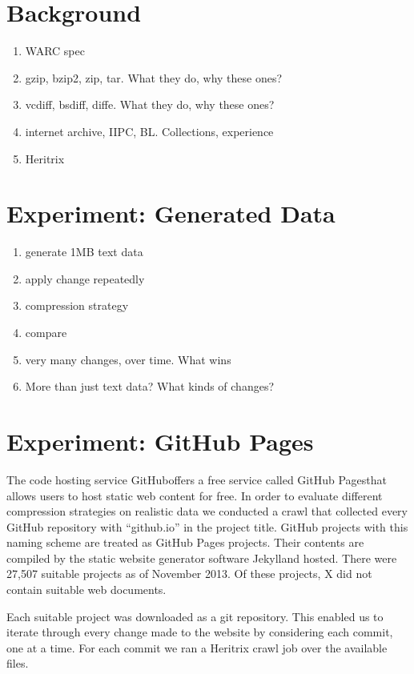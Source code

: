 \documentclass[11pt]{article}
\begin{document}
\section{Background}

\begin{enumerate}
\item WARC spec
\item gzip, bzip2, zip, tar. What they do, why these ones?
\item vcdiff, bsdiff, diffe. What they do, why these ones?
\item internet archive, IIPC, BL. Collections, experience
\item Heritrix
\end{enumerate}

\section{Experiment: Generated Data}

\begin{enumerate}
\item generate 1MB text data
\item apply change repeatedly
\item compression strategy
\item compare
\item very many changes, over time. What wins
\item More than just text data? What kinds of changes?
\end{enumerate}

\section{Experiment: GitHub Pages}\label{section:exp:github}

The code hosting service GitHub\footnotemark offers a free service called GitHub Pages\footnotemark that allows users to host static web content for free. In order to evaluate different compression strategies on realistic data we conducted a crawl that collected every GitHub repository with ``github.io'' in the project title. GitHub projects with this naming scheme are treated as GitHub Pages projects. Their contents are compiled by the static website generator software Jekyll\footnotemark and hosted. There were 27,507 suitable projects as of November 2013. Of these projects, X did not contain suitable web documents.

Each suitable project was downloaded as a git repository. This enabled us to iterate through every change made to the website by considering each commit, one at a time. For each commit we ran a Heritrix crawl job over the available files.
\end{document}
